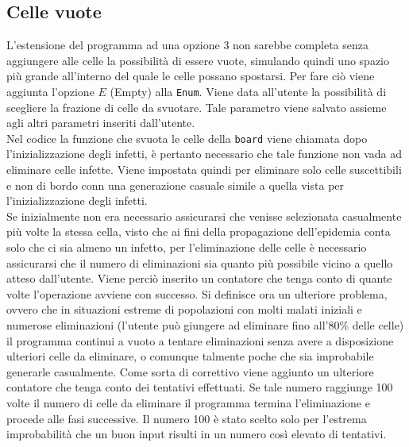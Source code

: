 \documentclass[a4paper]{article}
\begin{document}
\subsection{Celle vuote}
L'estensione del programma ad una opzione 3 non sarebbe completa senza aggiungere alle celle la possibilità di essere vuote, simulando quindi uno spazio più grande all'interno del quale le celle possano spostarsi. Per fare ciò viene aggiunta l'opzione $E$ (Empty) alla \texttt{Enum}. Viene data all'utente la possibilità di scegliere la frazione di celle da svuotare. Tale parametro viene salvato assieme agli altri parametri inseriti dall'utente.\\
Nel codice la funzione che svuota le celle della \texttt{board} viene chiamata dopo l'inizializzazione degli infetti, è pertanto necessario che tale funzione non vada ad eliminare celle infette. Viene impostata quindi per eliminare solo celle suscettibili e non di bordo conn una generazione casuale simile a quella vista per l'inizializzazione degli infetti.\\
Se inizialmente non era necessario assicurarsi che venisse selezionata casualmente più volte la stessa cella, visto che ai fini della propagazione dell'epidemia conta solo che ci sia almeno un infetto, per l'eliminazione delle celle è necessario assicurarsi che il numero di eliminazioni sia quanto più possibile vicino a quello atteso dall'utente. Viene perciò inserito un contatore che tenga conto di quante volte l'operazione avviene con successo. Si definisce ora un ulteriore problema, ovvero che in situazioni estreme di popolazioni con molti malati iniziali e numerose eliminazioni (l'utente può giungere ad eliminare fino all'80\% delle celle) il programma continui a vuoto a tentare eliminazioni senza avere a disposizione ulteriori celle da eliminare, o comunque talmente poche che sia improbabile generarle casualmente. Come sorta di correttivo viene aggiunto un ulteriore contatore che tenga conto dei tentativi effettuati. Se tale numero raggiunge 100 volte il numero di celle da eliminare il programma termina l'eliminazione e procede alle fasi successive. Il numero 100 è stato scelto solo per l'estrema improbabilità che un buon input risulti in un numero così elevato di tentativi.\\
\end{document}
